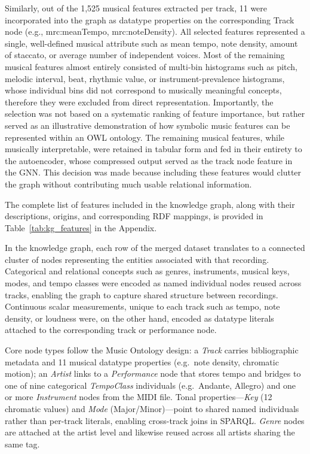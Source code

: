 Similarly, out of the 1,525 musical features extracted per track, 11 were incorporated into the graph as datatype properties on the corresponding Track node (e.g., mrc:meanTempo, mrc:noteDensity). All selected features represented a single, well-defined musical attribute such as mean tempo, note density, amount of staccato, or average number of independent voices. Most of the remaining musical features almost entirely consisted of multi-bin histograms such as pitch, melodic interval, beat, rhythmic value, or instrument-prevalence histograms, whose individual bins did not correspond to musically meaningful concepts, therefore they were excluded from direct representation. Importantly, the selection was not based on a systematic ranking of feature importance, but rather served as an illustrative demonstration of how symbolic music features can be represented within an OWL ontology. The remaining musical features, while musically interpretable, were retained in tabular form and fed in their entirety to the autoencoder, whose compressed output served as the track node feature in the GNN. This decision was made because including these features would clutter the graph without contributing much usable relational information.

The complete list of features included in the knowledge graph, along with their descriptions, origins, and corresponding RDF mappings, is provided in Table~\ref{tab:kg_features} in the Appendix.

In the knowledge graph, each row of the merged dataset translates to a connected cluster of nodes representing the entities associated with that recording. Categorical and relational concepts such as genres, instruments, musical keys, modes, and tempo classes were encoded as named individual nodes reused across tracks, enabling the graph to capture shared structure between recordings. Continuous scalar measurements, unique to each track such as tempo, note density, or loudness were, on the other hand, encoded as datatype literals attached to the corresponding track or performance node. 

Core node types follow the Music Ontology design: a \textit{Track} carries bibliographic metadata and 11 musical datatype properties (e.g.\ note density, chromatic motion); an \textit{Artist} links to a \textit{Performance} node that stores tempo and bridges to one of nine categorical \textit{TempoClass} individuals (e.g.\ Andante, Allegro) and one or more \textit{Instrument} nodes from the MIDI file. Tonal properties---\textit{Key} (12 chromatic values) and \textit{Mode} (Major/Minor)---point to shared named individuals rather than per-track literals, enabling cross-track joins in SPARQL. \textit{Genre} nodes are attached at the artist level and likewise reused across all artists sharing the same tag.

